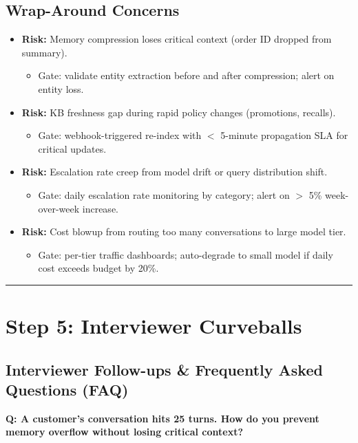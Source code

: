 \subsection*{Wrap-Around Concerns}

\begin{itemize}
  \item \textbf{Risk:} Memory compression loses critical context (order ID dropped from summary).
  \begin{itemize}
    \item Gate: validate entity extraction before and after compression; alert on entity loss.
  \end{itemize}
  \item \textbf{Risk:} KB freshness gap during rapid policy changes (promotions, recalls).
  \begin{itemize}
    \item Gate: webhook-triggered re-index with $<$ 5-minute propagation SLA for critical updates.
  \end{itemize}
  \item \textbf{Risk:} Escalation rate creep from model drift or query distribution shift.
  \begin{itemize}
    \item Gate: daily escalation rate monitoring by category; alert on $>$ 5\% week-over-week increase.
  \end{itemize}
  \item \textbf{Risk:} Cost blowup from routing too many conversations to large model tier.
  \begin{itemize}
    \item Gate: per-tier traffic dashboards; auto-degrade to small model if daily cost exceeds budget by 20\%.
  \end{itemize}
\end{itemize}

\bigskip\hrule\bigskip

\section*{Step 5: Interviewer Curveballs}

\subsection*{Interviewer Follow-ups \& Frequently Asked Questions (FAQ)}

\textbf{Q: A customer's conversation hits 25 turns. How do you prevent memory overflow without losing critical context?}

